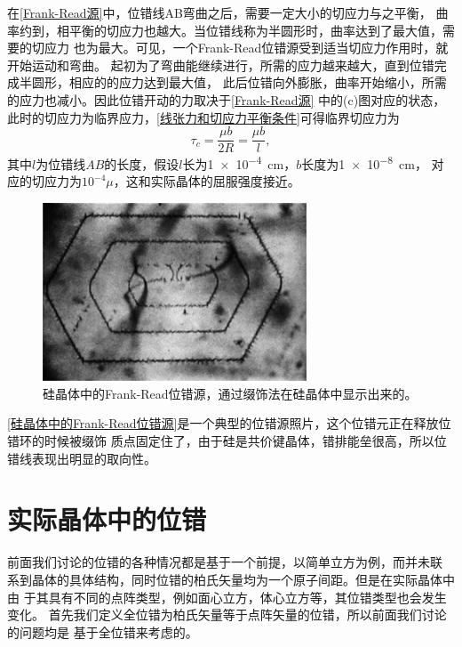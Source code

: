                 在\autoref{Frank-Read源}中，位错线AB弯曲之后，需要一定大小的切应力与之平衡，
                曲率约到，相平衡的切应力也越大。当位错线称为半圆形时，曲率达到了最大值，需要的切应力
                也为最大。可见，一个Frank-Read位错源受到适当切应力作用时，就开始运动和弯曲。
                起初为了弯曲能继续进行，所需的应力越来越大，直到位错完成半圆形，相应的的应力达到最大值，
                此后位错向外膨胀，曲率开始缩小，所需的应力也减小。因此位错开动的力取决于\autoref{Frank-Read源}
                中的(c)图对应的状态，此时的切应力为临界应力，\autoref{线张力和切应力平衡条件}可得临界切应力为
                \begin{equation}
                    \tau_c=\frac{\mu b}{2R}=\frac{\mu b}{l},
                \end{equation}
                其中$l$为位错线$AB$的长度，假设$l$长为\SI{1e-4}{\cm}，$b$长度为\SI{1e-8}{\cm}，
                对应的切应力为$10^{-4}\mu$，这和实际晶体的屈服强度接近。

                \begin{figure}[ht]
                    \centering
                    \includegraphics[width=0.7\textwidth]{fig/Frank_Read_source_in_a_silicon_crystal.jpg}
                    \caption{硅晶体中的Frank-Read位错源，通过缀饰法在硅晶体中显示出来的\cite{Dash1958}。}
                    \label{硅晶体中的Frank-Read位错源}
                \end{figure}

                \autoref{硅晶体中的Frank-Read位错源}是一个典型的位错源照片\cite{Dash1958}，这个位错元正在释放位错环的时候被缀饰
                质点固定住了，由于硅是共价键晶体，错排能垒很高，所以位错线表现出明显的取向性。
        \section{实际晶体中的位错}
            前面我们讨论的位错的各种情况都是基于一个前提，以简单立方为例，而并未联
            系到晶体的具体结构，同时位错的柏氏矢量均为一个原子间距。但是在实际晶体中由
            于其具有不同的点阵类型，例如面心立方，体心立方等，其位错类型也会发生变化。
            首先我们定义全位错为柏氏矢量等于点阵矢量的位错，所以前面我们讨论的问题均是
            基于全位错来考虑的。
            
